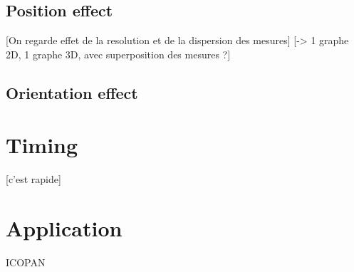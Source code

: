 \documentclass{InsightArticle}
\begin{document}
\subsection{Position effect}

[On regarde effet de la resolution et de la dispersion des mesures]
[-> 1 graphe 2D, 1 graphe 3D, avec superposition des mesures ?]

\subsection{Orientation effect}


\section{Timing}

[c'est rapide]

\section{Application}

ICOPAN


\appendix





\nocite{ITKSoftwareGuide}
\end{document}
